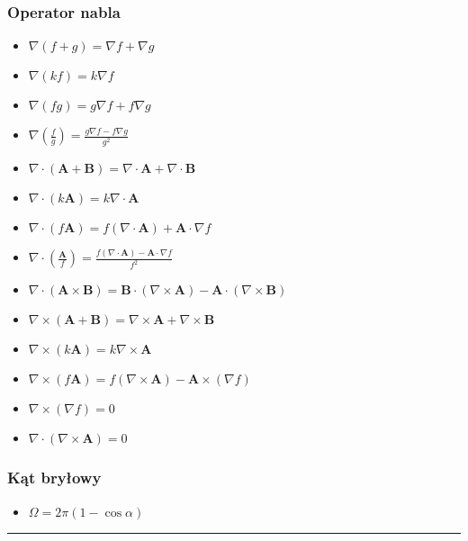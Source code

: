 \documentclass[../main.tex]{subfiles}
\begin{document}
\begin{multicols}{2}
\subsubsection*{Operator nabla}
\begin{itemize}
    \item \(\nabla(f+g)=\nabla f+\nabla g\)
    \item \(\nabla(kf)=k\nabla f\)
    \item \(\nabla(fg)=g\nabla f+f\nabla g\)
    \item \(\nabla(\frac{f}{g})=\frac{g\nabla f-f\nabla g}{g^2}\)
    \item \(\nabla\cdot(\mathbf{A}+\mathbf{B})=\nabla\cdot\mathbf{A}+\nabla\cdot\mathbf{B}\)
    \item \(\nabla\cdot(k\mathbf{A})=k\nabla\cdot\mathbf{A}\)
    \item \(\nabla\cdot (f\mathbf{A})=f(\nabla\cdot\mathbf{A})+\mathbf{A}\cdot\nabla f\)
    \item \(\nabla\cdot(\frac{\mathbf{A}}{f})=\frac{f(\nabla\cdot\mathbf{A})-\mathbf{A}\cdot\nabla f}{f^2}\)
    \item \(\nabla\cdot(\mathbf{A}\times\mathbf{B})=\mathbf{B}\cdot(\nabla\times\mathbf{A})-\mathbf{A}\cdot(\nabla\times\mathbf{B})\)
    \item \(\nabla\times(\mathbf{A}+\mathbf{B})=\nabla\times\mathbf{A}+\nabla\times\mathbf{B}\)
    \item \(\nabla\times(k\mathbf{A})=k\nabla\times\mathbf{A}\)
    \item \(\nabla\times(f\mathbf{A})=f(\nabla\times\mathbf{A})-\mathbf{A}\times(\nabla f)\)
    \item \(\nabla\times(\nabla f)=0\)
    \item \(\nabla\cdot(\nabla\times \mathbf{A})=0\)
\end{itemize}
\subsubsection*{Kąt bryłowy}
\begin{itemize}
    \item \(\Omega=2\pi(1-\cos\alpha)\)
\end{itemize}
\end{multicols}
\noindent\rule{\textwidth}{.5pt}
\end{document}
